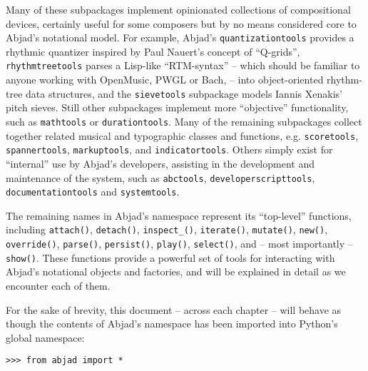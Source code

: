 \noindent Many of these subpackages implement opinionated collections of
compositional devices, certainly useful for some composers but by no means
considered core to Abjad's notational model. For example, Abjad's
\texttt{quantizationtools} provides a rhythmic quantizer inspired by Paul
Nauert's concept of \enquote{Q-grids}\cite{nauert1997timespan},
\texttt{rhythmtreetools} parses a Lisp-like \enquote{RTM-syntax} -- which
should be familiar to anyone working with OpenMusic\cite{assayag1999sw},
PWGL\cite{laurson2009qf, kuuskankare2004recent} or Bach\cite{agostini2013real},
-- into object-oriented rhythm-tree data structures, and the
\texttt{sievetools} subpackage models Iannis Xenakis' pitch
sieves\cite{xenakis1992formalized}. Still other subpackages implement more
\enquote{objective} functionality, such as \texttt{mathtools} or
\texttt{durationtools}. Many of the remaining subpackages collect together
related musical and typographic classes and functions, e.g.
\texttt{scoretools}, \texttt{spannertools}, \texttt{markuptools}, and
\texttt{indicatortools}. Others simply exist for \enquote{internal} use by
Abjad's developers, assisting in the development and maintenance of the system,
such as \texttt{abctools}, \texttt{developerscripttools},
\texttt{documentationtools} and \texttt{systemtools}.

The remaining names in Abjad's namespace represent its \enquote{top-level}
functions, including \texttt{attach()}, \texttt{detach()},
\texttt{inspect\_()}, \texttt{iterate()}, \texttt{mutate()}, \texttt{new()},
\texttt{override()}, \texttt{parse()}, \texttt{persist()}, \texttt{play()},
\texttt{select()}, and -- most importantly --
\texttt{show()}. These functions provide a powerful set of tools for
interacting with Abjad's notational objects and factories, and will be
explained in detail as we encounter each of them.

For the sake of brevity, this document -- across each chapter -- will behave as
though the contents of Abjad's namespace has been imported into Python's global
namespace:

\begin{comment}
<abjad>
from abjad import *
</abjad>
\end{comment}

\begin{abjadbookoutput}
\begin{singlespacing}
\vspace{-0.5\baselineskip}
\begin{lstlisting}
>>> from abjad import *
\end{lstlisting}
\end{singlespacing}
\end{abjadbookoutput}

